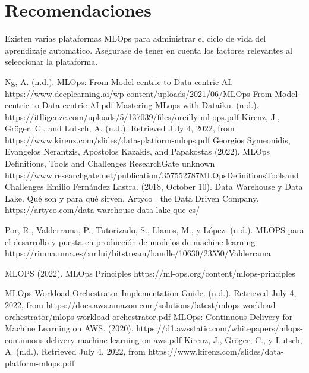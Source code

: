 \documentclass[twoside,twocolumn]{article}
\begin{document}
\section{Recomendaciones}
Existen varias plataformas MLOps para administrar el ciclo de vida del aprendizaje automatico. Asegurase de tener en cuenta los factores relevantes al seleccionar la plataforma.


 
 


\begin{thebibliography}{}

    Ng, A. (n.d.). MLOps: From Model-centric to Data-centric AI. https://www.deeplearning.ai/wp-content/uploads/2021/06/MLOps-From-Model-centric-to-Data-centric-AI.pdf
    Mastering MLops with Dataiku. (n.d.). https://itlligenze.com/uploads/5/137039/files/oreilly-ml-ops.pdf
    Kirenz, J., Gröger, C., and Lutsch, A. (n.d.). Retrieved July 4, 2022, from https://www.kirenz.com/slides/data-platform-mlops.pdf
    Georgios Symeonidis, Evangelos Nerantzis, Apostolos Kazakis, and Papakostas (2022). MLOps Definitions, Tools and Challenges ResearchGate unknown https://www.researchgate.net/publication/357552787MLOpsDefinitionsToolsandChallenges
    Emilio Fernández Lastra. (2018, October 10). Data Warehouse y Data Lake. Qué son y para qué sirven. Artyco | the Data Driven Company. https://artyco.com/data-warehouse-data-lake-que-es/
    
    Por, R., Valderrama, P., Tutorizado, S., Llanos, M., y López. (n.d.). MLOPS para el desarrollo y puesta en producción de modelos de machine learning https://riuma.uma.es/xmlui/bitstream/handle/10630/23550/Valderrama%
   
   MLOPS (2022). MLOps Principles https://ml-ops.org/content/mlops-principles
      
   MLOps Workload Orchestrator Implementation Guide. (n.d.). Retrieved July 4, 2022, from https://docs.aws.amazon.com/solutions/latest/mlops-workload-orchestrator/mlops-workload-orchestrator.pdf    
    MLOps: Continuous Delivery for Machine Learning on AWS. (2020). https://d1.awsstatic.com/whitepapers/mlops-continuous-delivery-machine-learning-on-aws.pdf
	Kirenz, J., Gröger, C., y Lutsch, A. (n.d.). Retrieved July 4, 2022, from https://www.kirenz.com/slides/data-platform-mlops.pdf

 
    \end{thebibliography}


\end{document}
